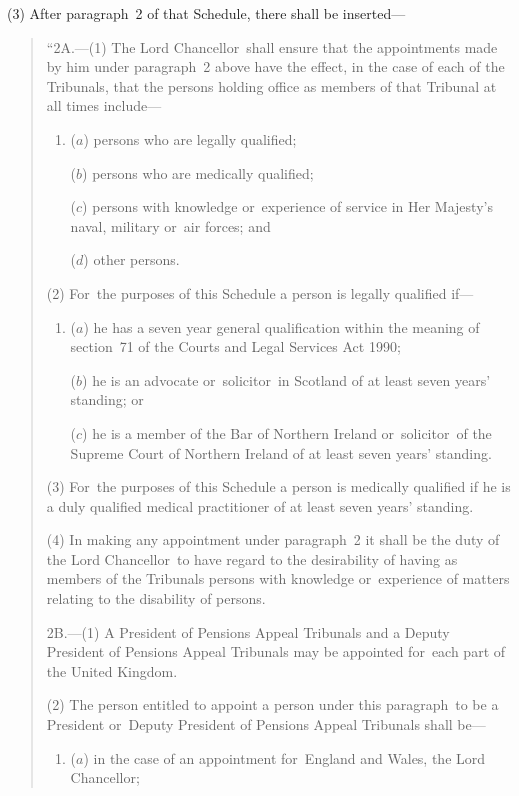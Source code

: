 \documentclass[12pt,a4paper]{article}
\begin{document}
(3) After paragraph~2 of that Schedule, there shall be inserted—
\begin{quotation}
“2A.---(1) The Lord Chancellor~shall ensure that the appointments made by him under paragraph~2 above have the effect, in the case of each of the Tribunals, that the persons holding office as members of that Tribunal at all times include—
\begin{enumerate}\item[]
($a$) persons who are legally qualified;

($b$) persons who are medically qualified;

($c$) persons with knowledge or~experience of service in Her Majesty’s naval, military or~air forces; and

($d$) other persons.
\end{enumerate}

(2) For~the purposes of this Schedule a person is legally qualified if—
\begin{enumerate}\item[]
($a$) he has a seven year general qualification within the meaning of section~71 of the Courts and Legal Services Act 1990;

($b$) he is an advocate or~solicitor~in Scotland of at least seven years' standing; or

($c$) he is a member of the Bar of Northern Ireland or~solicitor~of the Supreme Court of Northern Ireland of at least seven years' standing.
\end{enumerate}

(3) For~the purposes of this Schedule a person is medically qualified if he is a duly qualified medical practitioner of at least seven years' standing.

(4) In making any appointment under paragraph~2 it shall be the duty of the Lord Chancellor~to have regard to the desirability of having as members of the Tribunals persons with knowledge or~experience of matters relating to the disability of persons.

\medskip

2B.---(1) A President of Pensions Appeal Tribunals and a Deputy President of Pensions Appeal Tribunals may be appointed for~each part of the United Kingdom.

(2) The person entitled to appoint a person under this paragraph~to be a President or~Deputy President of Pensions Appeal Tribunals shall be—
\begin{enumerate}\item[]
($a$) in the case of an appointment for~England and Wales, the Lord Chancellor;


\end{enumerate}
\end{quotation}
\end{document}
